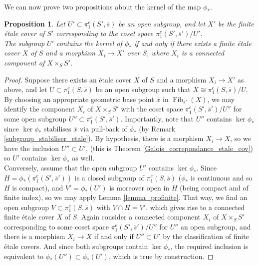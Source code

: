 \documentclass{article}
\theoremstyle{plain}
\newtheorem{proposition}[theorem]{Proposition}
\theoremstyle{definition}
\DeclareMathOperator{\Fib}{Fib}
\begin{document}
\noindent We can now prove two propositions about the kernel of the map $\phi_*$.
\begin{proposition}
\label{base_change_kernel}
    Let $U'\subset \pi^e_1(S',\overline{s})$ be an open subgroup, and let $X'$ be the finite \'etale cover of $S'$ corresponding to the coset space $\pi^e_1(S',\overline{s}')/U'$.\\
    The subgroup $U'$ contains the kernel of $\phi_*$ if and only if there exists a finite \'etale cover $X$ of $S$ and a morphism $X_i\rightarrow X'$ over $S$, where $X_i$ is a connected component of $X\times_SS'$.
\end{proposition}
\begin{proof}
    Suppose there exists an \'etale cover $X$ of $S$ and a morphism $X_i\rightarrow X'$ as above, and let $U\subset \pi^e_1(S,\overline{s})$ be an open subgroup such that $X\cong \pi^e_1(S,\overline{s})/U$.
    By choosing an appropriate geometric base point $\overline{x}$ in $\Fib_{\overline{s}'}(X)$, we may identify the component $X_i$ of $X\times_SS'$ with the coset space $\pi^e_1(S',\overline{s}')/U''$ for some open subgroup $U''\subset \pi^e_1(S',\overline{s}')$.
    Importantly, note that $U''$ contains $\ker\phi_*$ since $\ker\phi_*$ stabilises $\overline{x}$ via pull-back of $\phi_*$ (by Remark \ref{subgroup_stabiliser_etale}).
    By hypothesis, there is a morphism $X_i\rightarrow X$, so we have the inclusion $U''\subset U'$, (this is Theorem \ref{Galois_correpondance_etale_cov}) so $U'$ contains $\ker\phi_*$ as well.\\
    Conversely, assume that the open subgroup $U'$ contains $\ker\phi_*$. 
    Since $H=\phi_*(\pi^e_1(S',\overline{s}'))$ is a closed subgroup of $\pi^e_1(S,\overline{s})$ ($\phi_*$ is continuous and so $H$ is compact), and $V'=\phi_*(U')$ is moreover open in $H$ (being compact and of finite index), so we may apply Lemma \ref{lemma_profinite}.
    That way, we find an open subgroup $V\subset \pi^e_1(S,\overline{s})$ with $V\cap H = V'$, which gives rise to a connected finite \'etale cover $X$ of $S$.
    Again consider a connected component $X_i$ of $X\times_SS'$ corresponding to some coset space $\pi^e_1(S',\overline{s}')/U''$ for $U''$ an open subgroup, and there is a morphism $X_i\rightarrow X$ if and only if $U''\subset U'$ by the classification of finite \'etale covers.
    And since both subgroups contain $\ker\phi_*$, the required inclusion is equivalent to $\phi_*(U'')\subset \phi_*(U')$, which is true by construction.
\end{proof}
\end{document}
